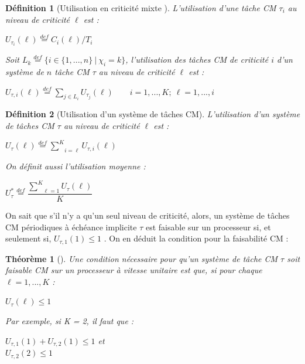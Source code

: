 \documentclass[12pt,a4paper,oneside]{book}
\theoremstyle{break}
\newtheorem{defin}{Définition}[chapter]
\theoremstyle{breakplain}
\newtheorem{theo}{Théorème}[chapter]
\begin{document}
\begin{defin}[Utilisation en criticité mixte \cite{BaruahBDMSS11}]
L'utilisation d'une tâche CM $\tau_i$ au niveau de criticité $\ell$ est :
\begin{center}
$U_{\tau_i}(\ell) \overset{def}{=} C_i(\ell)/T_i$
\end{center}
Soit $L_k \overset{def}{=} \{i \in \{1, ..., n\}\ |\ \chi_i = k\}$, l'utilisation des tâches CM de criticité $i$ d'un système de $n$ tâche CM $\tau$ au niveau de criticité $\ell$ est :
\begin{center}
$U_{\tau, i}(\ell) \overset{def}{=} \underset{j \in L_i}{\sum} U_{\tau_j}(\ell) \qquad i = 1,...,K;\ \ell = 1,...,i$\\
\end{center}
\end{defin}

\begin{defin}[Utilisation d'un système de tâches CM]
L'utilisation d'un système de tâches CM $\tau$ au niveau de criticité $\ell$ est :
\begin{center}
$U_\tau(\ell) \overset{def}{=} \underset{i = \ell}{\overset{K}{\sum}} U_{\tau,i}(\ell)$
\end{center}

\pagebreak

On définit aussi l'utilisation moyenne :
\begin{center}
$U_\tau^* \overset{def}{=} \dfrac{\underset{\ell = 1}{\overset{K}{\sum}} U_{\tau}(\ell)}{K}$\\
\end{center}
\end{defin}

On sait que s'il n'y a qu'un seul niveau de criticité, alors, un système de tâches CM périodiques à échéance implicite $\tau$ est faisable sur un processeur si, et seulement si, $U_{\tau, 1}(1) \leq 1$ \cite{liu1973scheduling}. On en déduit la condition pour la faisabilité CM :\\

\begin{theo}[\cite{BaruahBDMSS11}]
Une condition nécessaire pour qu'un système de tâche CM $\tau$ soit faisable CM sur un processeur à vitesse unitaire est que, si pour chaque $\ell = 1, ..., K$ :
\begin{center}
$U_\tau(\ell) \leq 1$
\end{center}
 
 Par exemple, si K = 2, il faut que :
 
\begin{center}
$U_{\tau, 1}(1) + U_{\tau, 2}(1) \leq 1$ et\\
$U_{\tau, 2}(2) \leq 1$
\end{center}

\end{theo}
\end{document}
